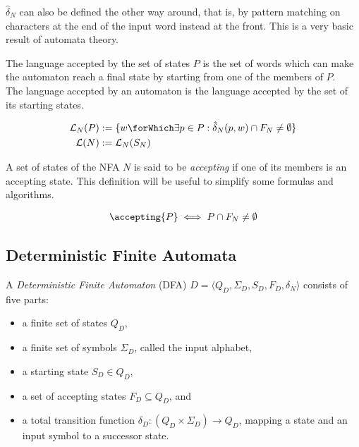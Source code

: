 $\hat{\delta}_N$ can also be defined the other way around, that is, by
  pattern matching on characters at the end of the input word instead at the front.
This is a very basic result of automata theory.

\begin{definition}
  The language accepted by the set of states $P$ is the set of words which can
  make the automaton reach a final state by starting from one of the members
  of $P$.\\
  The language accepted by an automaton is the language accepted by the set of
  its starting states.

  \begin{align*}
    \mathcal{L}_N(P) &:= \{ w \forWhich \exists p \in P: \hat{\delta}_N(p, w) \cap F_N \neq \emptyset\}\\
    \mathcal{L}(N) &:= \mathcal{L}_N(S_N)
  \end{align*}
\end{definition}

\begin{definition}
  A set of states of the NFA $N$ is said to be \emph{accepting} if one of its
  members is an accepting state.
  This definition will be useful to simplify some formulas and algorithms.

  \begin{align*}
    \accepting{P} \iff P \cap F_N \neq \emptyset
  \end{align*}
\end{definition}

\subsection{Deterministic Finite Automata}

\begin{definition}
  A \emph{Deterministic Finite Automaton} (DFA)
  $D = \langle Q_D, \Sigma_D, S_D, F_D, \delta_N \rangle$
  consists of five parts:

  \begin{itemize}
    \item a finite set of states $Q_D$,
    \item a finite set of symbols $\Sigma_D$, called the input alphabet,
    \item a starting state $S_D \in Q_D$,
    \item a set of accepting states $F_D \subseteq Q_D$, and
    \item a total transition function
            $\delta_D : (Q_D \times \Sigma_D) \to Q_D$,
             mapping a state and an input symbol to a successor state.
  \end{itemize}

\end{definition}

